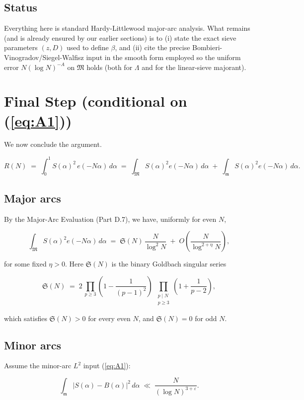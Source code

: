 \documentclass[11pt]{article}
\def\eqref#1{(\ref{#1})}%
\theoremstyle{definition}
\theoremstyle{remark}
\numberwithin{equation}{part}
\begin{document}
\subsection{Status}
Everything here is standard Hardy-Littlewood major-arc analysis.  What remains (and is already ensured by our earlier sections) is to (i) state the exact sieve parameters $(z,D)$ used to define $\beta$, and (ii) cite the precise Bombieri-Vinogradov/Siegel-Walfisz input in the smooth form employed so the uniform error $N(\log N)^{-A}$ on $\mathfrak M$ holds (both for $\Lambda$ and for the linear-sieve majorant).

\section{Final Step (conditional on \eqref{eq:A1})}

We now conclude the argument.

$$
	R(N)\;=\;\int_0^1 S(\alpha)^2\,e(-N\alpha)\,d\alpha
	\;=\;\int_{\mathfrak M} S(\alpha)^2 e(-N\alpha)\,d\alpha
	\;+\;\int_{\mathfrak m} S(\alpha)^2 e(-N\alpha)\,d\alpha.
$$

\subsection{Major arcs}

By the Major-Arc Evaluation (Part D.7), we have, uniformly for even $N$,

$$
	\int_{\mathfrak M} S(\alpha)^2 e(-N\alpha)\,d\alpha
	\;=\;\mathfrak S(N)\,\frac{N}{\log^2 N}\;+\;O\!\left(\frac{N}{\log^{2+\eta}N}\right),
$$

for some fixed $\eta>0$. Here $\mathfrak S(N)$ is the binary Goldbach singular series

$$
	\mathfrak S(N)
	\;=\;2\,\prod_{p\ge 3}\!\left(1-\frac{1}{(p-1)^2}\right)
	\;\prod_{\substack{p\mid N\\ p\ge 3}}\!\!\left(1+\frac{1}{p-2}\right),
$$

which satisfies $\mathfrak S(N)>0$ for every even $N$, and $\mathfrak S(N)=0$ for odd $N$.

\subsection{Minor arcs}

Assume the minor-arc $L^2$ input \eqref{eq:A1}:

$$
	\int_{\mathfrak m} |S(\alpha)-B(\alpha)|^2\,d\alpha
	\;\ll\;\frac{N}{(\log N)^{3+\varepsilon}}.
$$
\end{document}
